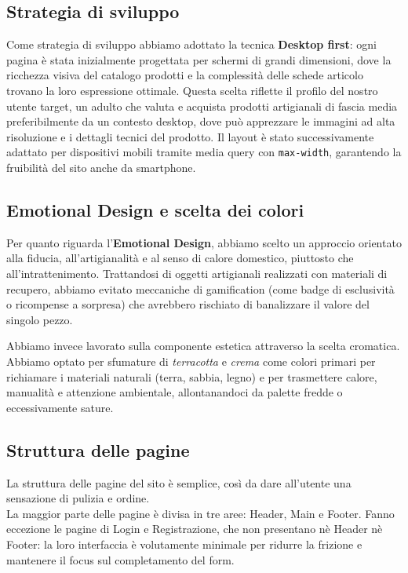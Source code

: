 \documentclass[11pt,a4paper]{article}
\begin{document}
\subsection{Strategia di sviluppo}
Come strategia di sviluppo abbiamo adottato la tecnica \textbf{Desktop first}: ogni pagina \`e stata inizialmente progettata per schermi di grandi dimensioni, dove la ricchezza visiva del catalogo prodotti e la complessit\`a delle schede articolo trovano la loro espressione ottimale. Questa scelta riflette il profilo del nostro utente target, un adulto che valuta e acquista prodotti artigianali di fascia media preferibilmente da un contesto desktop, dove pu\`o apprezzare le immagini ad alta risoluzione e i dettagli tecnici del prodotto. Il layout \`e stato successivamente adattato per dispositivi mobili tramite media query con \texttt{max-width}, garantendo la fruibilit\`a del sito anche da smartphone.

\subsection{Emotional Design e scelta dei colori}
Per quanto riguarda l'\textbf{Emotional Design}, abbiamo scelto un approccio orientato alla fiducia, all'artigianalit\`a e al senso di calore domestico, piuttosto che all'intrattenimento. Trattandosi di oggetti artigianali realizzati con materiali di recupero, abbiamo evitato meccaniche di gamification (come badge di esclusivit\`a o ricompense a sorpresa) che avrebbero rischiato di banalizzare il valore del singolo pezzo.

Abbiamo invece lavorato sulla componente estetica attraverso la scelta cromatica. Abbiamo optato per sfumature di \textit{terracotta} e \textit{crema} come colori primari per richiamare i materiali naturali (terra, sabbia, legno) e per trasmettere calore, manualit\`a e attenzione ambientale, allontanandoci da palette fredde o eccessivamente sature.

\subsection{Struttura delle pagine}
La struttura delle pagine del sito \`e semplice, cos\`i da dare all'utente una sensazione di pulizia e ordine.\\
La maggior parte delle pagine \`e divisa in tre aree: Header, Main e Footer. Fanno eccezione le pagine di Login e Registrazione, che non presentano n\`e Header n\`e Footer: la loro interfaccia \`e volutamente minimale per ridurre la frizione e mantenere il focus sul completamento del form.
\end{document}

